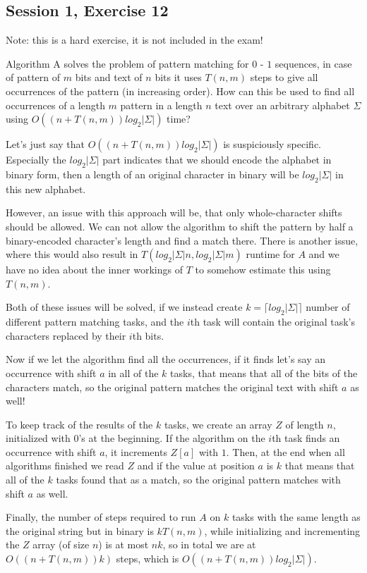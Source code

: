 \subsection{Session 1, Exercise 12}

Note: this is a hard exercise, it is not included in the exam!


Algorithm A solves the problem of pattern matching for $0$ - $1$ sequences, in case of pattern of $m$ bits and text of $n$ bits it uses $T(n, m)$ steps to give all occurrences of the pattern (in increasing order). How can this be used to find all occurrences of a length $m$ pattern in a length $n$ text over an arbitrary alphabet $\Sigma$ using $O((n + T(n, m))log_2|\Sigma|)$ time?


Let's just say that $O((n + T(n, m))log_2|\Sigma|)$ is suspiciously specific. Especially the $log_2|\Sigma|$ part indicates that we should encode the alphabet in binary form, then a length of an original character in binary will be $log_2|\Sigma|$ in this new alphabet.

However, an issue with this approach will be, that only whole-character shifts should be allowed. We can not allow the algorithm to shift the pattern by half a binary-encoded character's length and find a match there. There is another issue, where this would also result in $T(log_2|\Sigma|n, log_2|\Sigma|m)$ runtime for $A$ and we have no idea about the inner workings of $T$ to somehow estimate this using $T(n,m)$.

Both of these issues will be solved, if we instead create $k = \lceil log_2|\Sigma| \rceil$ number of different pattern matching tasks, and the $i$th task will contain the original task's characters replaced by their $i$th bits.

Now if we let the algorithm find all the occurrences, if it finds let's say an occurrence with shift $a$ in all of the $k$ tasks, that means that all of the bits of the characters match, so the original pattern matches the original text with shift $a$ as well!

To keep track of the results of the $k$ tasks, we create an array $Z$ of length $n$, initialized with $0$'s at the beginning. If the algorithm on the $i$th task finds an occurrence with shift $a$, it increments $Z[a]$ with $1$. Then, at the end when all algorithms finished we read $Z$ and if the value at position $a$ is $k$ that means that all of the $k$ tasks found that as a match, so the original pattern matches with shift $a$ as well.

Finally, the number of steps required to run $A$ on $k$ tasks with the same length as the original string but in binary is $kT(n, m)$, while initializing and incrementing the $Z$ array (of size $n$) is at most $nk$, so in total we are at $O((n+T(n,m))k)$ steps, which is $O((n+T(n,m))log_2|\Sigma|)$.
